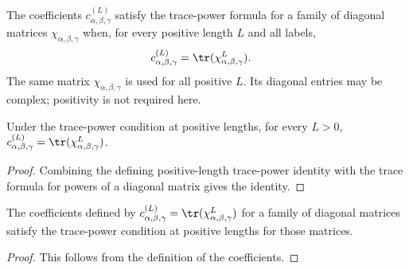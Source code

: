 \begin{definition}%
    \label{def:mpdo_bnt_label_positive_length_chi_trace_power_form}
    \leanok
    The coefficients $c^{(L)}_{\alpha,\beta,\gamma}$ satisfy the trace-power
    formula for a family of diagonal matrices $\chi_{\alpha,\beta,\gamma}$
    when, for every positive length $L$ and all labels,
    \begin{align}
        c^{(L)}_{\alpha,\beta,\gamma}
         & =
        \tr(\chi_{\alpha,\beta,\gamma}^{L}).
        \notag
    \end{align}
    The same matrix $\chi_{\alpha,\beta,\gamma}$ is used for all positive
    $L$. Its diagonal entries may be complex; positivity is not required
    here.
\end{definition}

\begin{lemma}%
    \label{lem:mpdo_bnt_label_chi_eq_trace_matrix_pow}
    \leanok
    Under the trace-power condition at positive lengths, for every $L>0$,
    $c^{(L)}_{\alpha,\beta,\gamma}
        = \tr(\chi_{\alpha,\beta,\gamma}^{L})$.
\end{lemma}
\begin{proof}\leanok
    Combining the defining positive-length trace-power identity with the trace
    formula for powers of a diagonal matrix gives the identity.
\end{proof}

\begin{lemma}%
    \label{lem:mpdo_bnt_label_of_chi_positive_length_trace_power}
    \leanok
    The coefficients defined by
    $c^{(L)}_{\alpha,\beta,\gamma}=\tr(\chi_{\alpha,\beta,\gamma}^{L})$
    for a family of diagonal matrices satisfy the trace-power condition at
    positive lengths for those matrices.
\end{lemma}
\begin{proof}\leanok
    This follows from the definition of the coefficients.
\end{proof}

